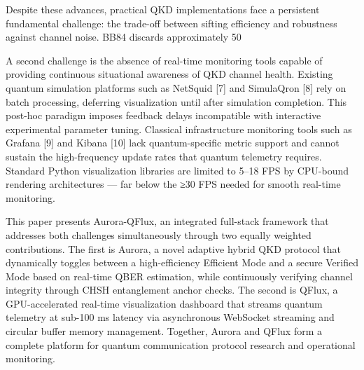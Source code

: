 Despite these advances, practical QKD implementations face a persistent fundamental challenge: the trade-off between sifting efficiency and robustness against channel noise. BB84 discards approximately 50%

A second challenge is the absence of real-time monitoring tools capable of providing continuous situational awareness of QKD channel health. Existing quantum simulation platforms such as NetSquid [7] and SimulaQron [8] rely on batch processing, deferring visualization until after simulation completion. This post-hoc paradigm imposes feedback delays incompatible with interactive experimental parameter tuning. Classical infrastructure monitoring tools such as Grafana [9] and Kibana [10] lack quantum-specific metric support and cannot sustain the high-frequency update rates that quantum telemetry requires. Standard Python visualization libraries are limited to 5–18 FPS by CPU-bound rendering architectures — far below the ≥30 FPS needed for smooth real-time monitoring.

This paper presents Aurora-QFlux, an integrated full-stack framework that addresses both challenges simultaneously through two equally weighted contributions. The first is Aurora, a novel adaptive hybrid QKD protocol that dynamically toggles between a high-efficiency Efficient Mode and a secure Verified Mode based on real-time QBER estimation, while continuously verifying channel integrity through CHSH entanglement anchor checks. The second is QFlux, a GPU-accelerated real-time visualization dashboard that streams quantum telemetry at sub-100 ms latency via asynchronous WebSocket streaming and circular buffer memory management. Together, Aurora and QFlux form a complete platform for quantum communication protocol research and operational monitoring.

